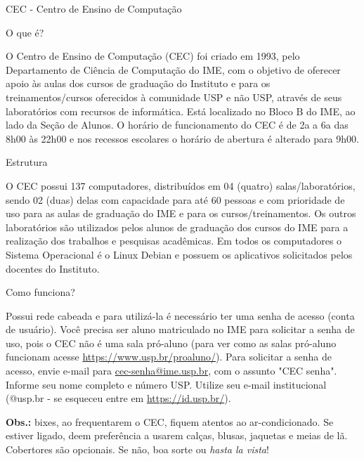 \begin{secao}{CEC - Centro de Ensino de Computação}

\begin{subsecao}{O que é?}

O Centro de Ensino de Computação (CEC) foi criado em 1993, pelo
Departamento de Ciência de Computação do IME, com o objetivo de
oferecer apoio às aulas dos cursos de graduação do Instituto e para os
treinamentos/cursos oferecidos à comunidade USP e não USP, através de
seus laboratórios com recursos de informática.
Está localizado no Bloco B do IME, ao lado da Seção de Alunos. O horário
de funcionamento do CEC é de 2a a 6a das 8h00 às 22h00 e nos recessos
escolares o horário de abertura é alterado para 9h00.

\end{subsecao}

\begin{subsecao}{Estrutura}

O CEC possui 137 computadores, distribuídos em 04 (quatro) salas/laboratórios,
sendo 02 (duas) delas com capacidade para até 60 pessoas e com prioridade de uso
para as aulas de graduação do IME e para os cursos/treinamentos. Os outros
laboratórios são utilizados pelos alunos de graduação dos cursos do IME para a
realização dos trabalhos e pesquisas acadêmicas. Em todos os computadores o Sistema
Operacional é o Linux Debian e possuem os aplicativos solicitados pelos docentes
do Instituto.

\end{subsecao}

\begin{subsecao}{Como funciona?}

Possui rede cabeada e para utilizá-la é necessário ter uma senha de
acesso (conta de usuário). Você precisa ser aluno matriculado no IME para
solicitar a senha de uso, pois o CEC não é uma sala pró-aluno (para ver
como as salas pró-aluno funcionam acesse \url{https://www.usp.br/proaluno/}). 
Para solicitar a senha de acesso, envie e-mail para \url{cec-senha@ime.usp.br},
com o assunto "CEC senha". Informe seu nome completo e número USP. Utilize
seu e-mail institucional (@usp.br - se esqueceu entre em
\url{https://id.usp.br/}).

\end{subsecao}

\textbf{Obs.:} bixes, ao frequentarem o CEC, fiquem atentos ao ar-condicionado. Se
estiver ligado, deem preferência a usarem calças, blusas, jaquetas e meias de
lã. Cobertores são opcionais. Se não, boa sorte ou \textit{hasta la vista}!

\end{secao}
